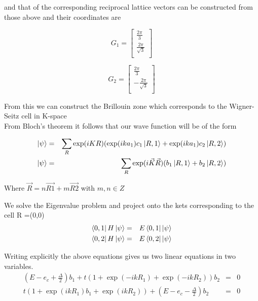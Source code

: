 \documentclass[a4paper]{article}
\begin{document}
and that of the corresponding reciprocal lattice vectors can be constructed from those above and their coordinates are \\
\begin{minipage}{0.5\textwidth}
\centering
\begin{equation*}
G_1 =
\begin{bmatrix}
    \frac{2\pi}{3} \\
    \frac{2\pi}{\sqrt{3}} \\
\end{bmatrix}
\end{equation*}


\end{minipage}
\begin{minipage}{0.5\textwidth}
\centering
\begin{equation*}
G_2 =
\begin{bmatrix}
    \frac{2\pi}{3} \\
    -\frac{2\pi}{\sqrt{3}} \\
\end{bmatrix}
\end{equation*}
\end{minipage}

From this we can construct the Brillouin zone which corresponds to the Wigner-Seitz cell in K-space\\

From Bloch's theorem it follows that our wave function will be of the form

\begin{eqnarray}
    \ket{\psi}&=&\sum_{R}\exp(iKR)(\exp(ika_{1})c_{1}\ket{R,1} + \exp(ika_{1})c_{2}\ket{R,2} )\\
	\ket{\psi}&=&\sum_{R}\exp(i\vec{K}\vec{R})(b_{1}\ket{R,1} + b_{2}\ket{R,2} )
\end{eqnarray}


Where $\vec{R} = n\vec{R1} + m\vec{R2} $  with $m,n \in Z$

We solve the Eigenvalue problem and project onto the kets corresponding to the cell R =(0,0) 
\begin{eqnarray}
\bra{0,1}H\ket{\psi}&=&E\bra{0,1}\ket{\psi}\\
\bra{0,2}H\ket{\psi}&=&E\bra{0,2}\ket{\psi}
\end{eqnarray}

Writing explicitly the above equations gives us two linear equations in two variables. 
\begin{eqnarray}
(E-e_{c} + \frac{\Delta}{2})b_1  +  t(1 + \exp(-ikR_{1}) + \exp(-ikR_{2}))b_2 & = & 0\\
 t(1 + \exp(ikR_{1})b_1 + \exp(ikR_{2})) + (E-e_{c}-\frac{\Delta}{2})b_2 & = &  0
\end{eqnarray}
\end{document}
